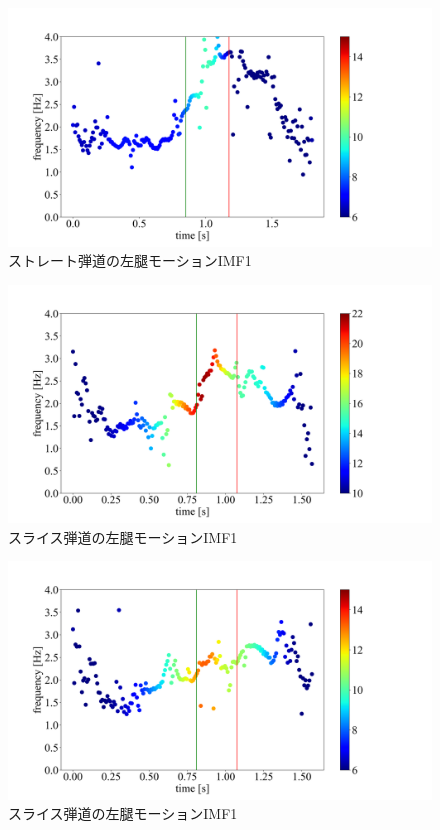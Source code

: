 \begin{figure}
    \centering
    \includegraphics[width=1.0\linewidth]{./images/straight_data/left_leg/IMF4.png}
    \caption{ストレート弾道の左腿モーションIMF1}
    \label{straight left leg imf4}
\end{figure}

\begin{figure}
    \centering
    \includegraphics[width=1.0\linewidth]{./images/opening_data/left_up_leg/IMF4.png}
    \caption{スライス弾道の左腿モーションIMF1}
    \label{opening left up leg imf4}
\end{figure}

\begin{figure}
    \centering
    \includegraphics[width=1.0\linewidth]{./images/opening_data/left_leg/IMF4.png}
    \caption{スライス弾道の左腿モーションIMF1}
    \label{opening left leg imf4}
\end{figure}

